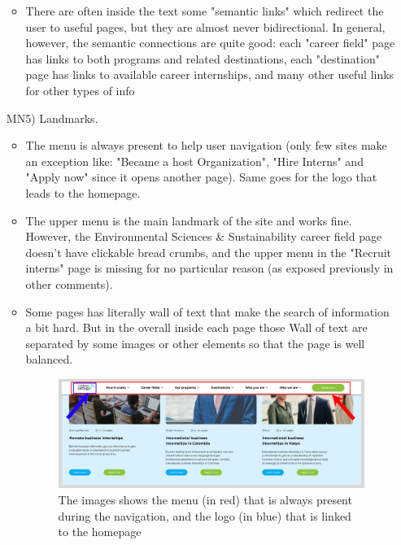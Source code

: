 \documentclass[11pt, letterpaper]{article}
\begin{document}
\begin{enumerate}
\begin{itemize}
            \item There are often inside the text some "semantic links" which redirect the user to useful pages, but they are almost never bidirectional. In general, however, the semantic connections are quite good: each "career field" page has links to both programs and related destinations, each "destination" page has links to available career internships, and many other useful links for other types of info
            \end{itemize}
        \item[MN5)] Landmarks.
            \begin{itemize}
                \item The menu is always present to help user navigation (only few sites make an exception like: "Became a host Organization", "Hire Interns" and "Apply now" since it opens another page). Same goes for the logo that leads to the homepage.
                \item The upper menu is the main landmark of the site and works fine. However, the Environmental Sciences \& Sustainability career field page doesn't have clickable bread crumbs, and the upper menu in the "Recruit interns" page is missing for no particular reason (as exposed previously in other comments).
                \item Some pages has literally wall of text that make the search of information a bit hard. But in the overall inside each page those Wall of text are separated by some images or other elements so that the page is well balanced. 
                \begin{figure}[H]
                    \centering
                    \includegraphics[width=14cm]{images/inspection/MN5.png}
                    \caption{The images shows the menu (in red) that is always present during the navigation, and the logo (in blue) that is linked to the homepage}
                \end{figure}
            \end{itemize}
    \end{enumerate}
    
\end{document}
